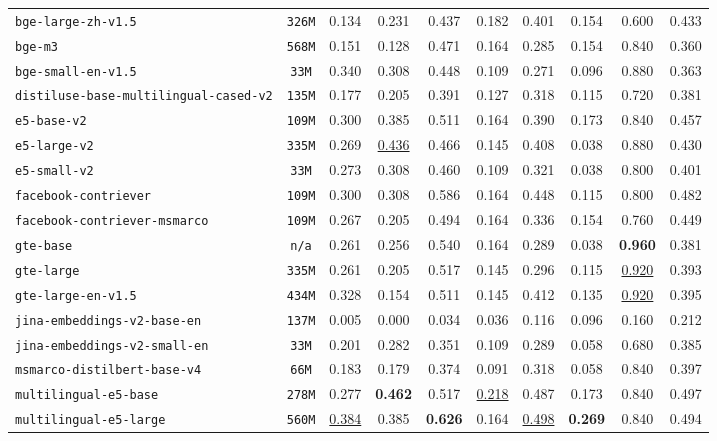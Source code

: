 \documentclass{article}
\begin{document}
\begin{table}[htbp]
{\begin{tabular}{lccccccccc}
\texttt{bge-large-zh-v1.5} & \texttt{326M} & 0.134 & 0.231 & 0.437 & 0.182 & 0.401 & 0.154 & 0.600 & 0.433 \\
\texttt{bge-m3} & \texttt{568M} & 0.151 & 0.128 & 0.471 & 0.164 & 0.285 & 0.154 & 0.840 & 0.360 \\
\texttt{bge-small-en-v1.5} & \texttt{33M} & 0.340 & 0.308 & 0.448 & 0.109 & 0.271 & 0.096 & 0.880 & 0.363 \\
\texttt{distiluse-base-multilingual-cased-v2} & \texttt{135M} & 0.177 & 0.205 & 0.391 & 0.127 & 0.318 & 0.115 & 0.720 & 0.381 \\
\texttt{e5-base-v2} & \texttt{109M} & 0.300 & 0.385 & 0.511 & 0.164 & 0.390 & 0.173 & 0.840 & 0.457 \\
\texttt{e5-large-v2} & \texttt{335M} & 0.269 & \underline{0.436} & 0.466 & 0.145 & 0.408 & 0.038 & 0.880 & 0.430 \\
\texttt{e5-small-v2} & \texttt{33M} & 0.273 & 0.308 & 0.460 & 0.109 & 0.321 & 0.038 & 0.800 & 0.401 \\
\texttt{facebook-contriever} & \texttt{109M} & 0.300 & 0.308 & 0.586 & 0.164 & 0.448 & 0.115 & 0.800 & 0.482 \\
\texttt{facebook-contriever-msmarco} & \texttt{109M} & 0.267 & 0.205 & 0.494 & 0.164 & 0.336 & 0.154 & 0.760 & 0.449 \\
\texttt{gte-base} & \texttt{n/a} & 0.261 & 0.256 & 0.540 & 0.164 & 0.289 & 0.038 & \textbf{0.960} & 0.381 \\
\texttt{gte-large} & \texttt{335M} & 0.261 & 0.205 & 0.517 & 0.145 & 0.296 & 0.115 & \underline{0.920} & 0.393 \\
\texttt{gte-large-en-v1.5} & \texttt{434M} & 0.328 & 0.154 & 0.511 & 0.145 & 0.412 & 0.135 & \underline{0.920} & 0.395 \\
\texttt{jina-embeddings-v2-base-en} & \texttt{137M} & 0.005 & 0.000 & 0.034 & 0.036 & 0.116 & 0.096 & 0.160 & 0.212 \\
\texttt{jina-embeddings-v2-small-en} & \texttt{33M} & 0.201 & 0.282 & 0.351 & 0.109 & 0.289 & 0.058 & 0.680 & 0.385 \\
\texttt{msmarco-distilbert-base-v4} & \texttt{66M} & 0.183 & 0.179 & 0.374 & 0.091 & 0.318 & 0.058 & 0.840 & 0.397 \\
\texttt{multilingual-e5-base} & \texttt{278M} & 0.277 & \textbf{0.462} & 0.517 & \underline{0.218} & 0.487 & 0.173 & 0.840 & 0.497 \\
\texttt{multilingual-e5-large} & \texttt{560M} & \underline{0.384} & 0.385 & \textbf{0.626} & 0.164 & \underline{0.498} & \textbf{0.269} & 0.840 & 0.494 \\

\end{tabular}}
\end{table}
\end{document}
